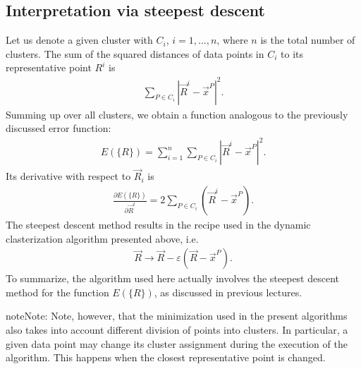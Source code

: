 \documentclass[letterpaper,10pt,english]{jupyterBook}
\begin{document}
\subsection{Interpretation via steepest descent}
\label{\detokenize{docs/unsupervised:interpretation-via-steepest-descent}}
\sphinxAtStartPar
Let us denote a given cluster with \(C_i\), \(i = 1, ..., n\), where \( n \) is the total number of clusters. The sum of the squared distances of data points in \( C_i \) to its representative point \( R ^ i \) is
\begin{equation*}
\begin{split}
\sum_{P \in C_i} | \vec{R}^i- \vec{x}^P|^2.
\end{split}
\end{equation*}
\sphinxAtStartPar
Summing up over all clusters, we obtain a function analogous to the previously discussed error function:
\begin{equation*}
\begin{split}E (\{R \}) = \sum_{i = 1}^ n \sum_ {P \in C_i} |\vec{R}^i- \vec{x}^P |^2 .\end{split}
\end{equation*}
\sphinxAtStartPar
Its derivative with respect to \( \vec{R}_i \) is
\begin{equation*}
\begin{split} \frac{\partial E (\{R \})}{\partial \vec{R}^i}
= 2 \sum_{P \in C_i} (\vec{R}^i- \vec{x}^P). \end{split}
\end{equation*}
\sphinxAtStartPar
The steepest descent method results  in the recipe used in the
dynamic clasterization algorithm presented above, i.e.
\begin{equation*}
\begin{split} \vec{R} \to \vec{R} - \varepsilon (\vec{R} - \vec {x}^P). \end{split}
\end{equation*}
\sphinxAtStartPar
To summarize, the algorithm used here actually involves the steepest descent method for the function \( E (\{R \})\), as discussed in previous lectures.

\begin{sphinxadmonition}{note}{Note:}
\sphinxAtStartPar
Note, however, that the minimization used in the present algorithms also takes into account different division of points into clusters. In particular, a given data point may change its cluster assignment during the execution of the algorithm. This happens when the closest representative point is changed.
\end{sphinxadmonition}
\end{document}
